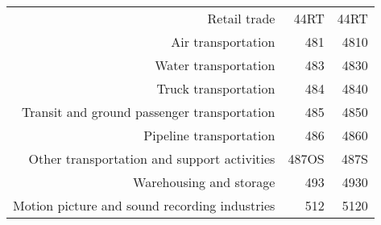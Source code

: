\begin{landscape}
\begin{table}[h]
\begin{center}
\begin{tabular}{rrr}
Retail trade                                                         & 44RT        & 44RT      \\%
Air transportation                                                   & 481         & 4810      \\%
Water transportation                                                 & 483         & 4830      \\%
Truck transportation                                                 & 484         & 4840      \\%
Transit and ground passenger transportation                          & 485         & 4850      \\%
Pipeline transportation                                              & 486         & 4860      \\%
Other transportation and support activities                          & 487OS       & 487S      \\%
Warehousing and storage                                              & 493         & 4930      \\%
Motion picture and sound recording industries                        & 512         & 5120      \\%

\end{tabular}
\end{center}
\end{table}
\end{landscape}
